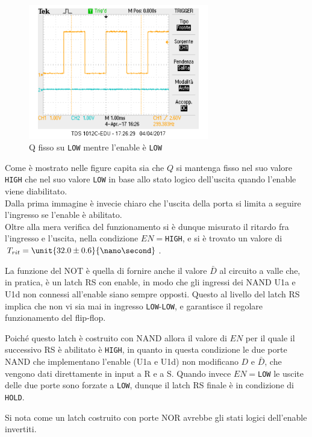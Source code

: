 \documentclass[a4paper,10pt]{article}
\def\code#1{\texttt{#1}}
\begin{document}
\begin{figure}[H]
	\centering
	\includegraphics[width=0.7\textwidth]{../grafici/EnableDown1.png}
	\caption{Q fisso su \code{LOW} mentre l'enable è \code{LOW}}
	\label{fig:FFD}
\end{figure}

Come è mostrato nelle figure capita sia che $Q$ si mantenga fisso nel suo valore \code{HIGH} che nel suo valore \code{LOW} in base allo stato logico dell'uscita quando l'enable viene diabilitato.\\
Dalla prima immagine è invecie chiaro che l'uscita della porta si limita a seguire l'ingresso se l'enable è abilitato.\\
Oltre alla mera verifica del funzionamento si è dunque misurato il ritardo fra l'ingresso e l'uscita, nella condizione $EN=$\code{HIGH}, e si è trovato un valore di $T_{rit}=\unit{32.0\pm 0.6 }{\nano\second}$.
\newline 

La funzione del NOT è quella di fornire anche il valore $\bar{D}$ al circuito a valle che, in pratica, è un latch RS con enable, in modo che gli ingressi dei NAND U1a e U1d non connessi all'enable siano sempre opposti. Questo al livello del latch RS implica che non vi sia mai in ingresso \code{LOW}-\code{LOW}, e garantisce il regolare funzionamento del flip-flop.
 
Poiché questo latch è costruito con NAND allora il valore di $EN$ per il quale il successivo RS è abilitato è \code{HIGH}, in quanto in questa condizione le due porte NAND che implementano l'enable (U1a e U1d) non modificano $D$ e $\bar{D}$, che vengono dati direttamente in input a R e a S. Quando invece $EN=$\code{LOW} le uscite delle due porte sono forzate a \code{LOW}, dunque il latch RS finale è in condizione di \code{HOLD}.

Si nota come un latch costruito con porte NOR avrebbe gli stati logici dell'enable invertiti.
\end{document}
